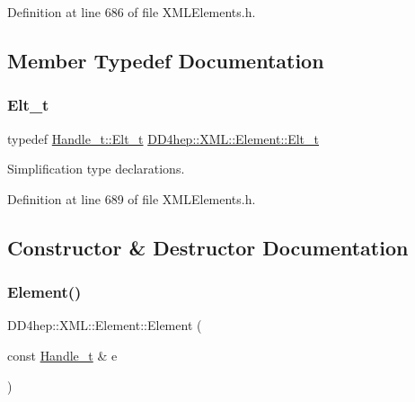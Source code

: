 Definition at line 686 of file X\+M\+L\+Elements.\+h.



\subsection{Member Typedef Documentation}
\hypertarget{class_d_d4hep_1_1_x_m_l_1_1_element_af63782f6873c3d8c9b28e1777cde9275}{}\label{class_d_d4hep_1_1_x_m_l_1_1_element_af63782f6873c3d8c9b28e1777cde9275} 
\subsubsection{\texorpdfstring{Elt\+\_\+t}{Elt\_t}}
{\footnotesize\ttfamily typedef \hyperlink{class_d_d4hep_1_1_x_m_l_1_1_handle__t_a81a72155f29971b37652430a334a6b30}{Handle\+\_\+t\+::\+Elt\+\_\+t} \hyperlink{class_d_d4hep_1_1_x_m_l_1_1_element_af63782f6873c3d8c9b28e1777cde9275}{D\+D4hep\+::\+X\+M\+L\+::\+Element\+::\+Elt\+\_\+t}}



Simplification type declarations. 



Definition at line 689 of file X\+M\+L\+Elements.\+h.



\subsection{Constructor \& Destructor Documentation}
\hypertarget{class_d_d4hep_1_1_x_m_l_1_1_element_aa30c6619a40cf7e61e6e07d2f21277e5}{}\label{class_d_d4hep_1_1_x_m_l_1_1_element_aa30c6619a40cf7e61e6e07d2f21277e5} 
\subsubsection{\texorpdfstring{Element()}{Element()}\hspace{0.1cm}{\footnotesize\ttfamily [1/3]}}
{\footnotesize\ttfamily D\+D4hep\+::\+X\+M\+L\+::\+Element\+::\+Element (\begin{DoxyParamCaption}\item[{const \hyperlink{class_d_d4hep_1_1_x_m_l_1_1_handle__t}{Handle\+\_\+t} \&}]{e }\end{DoxyParamCaption})\hspace{0.3cm}{\ttfamily [inline]}}



